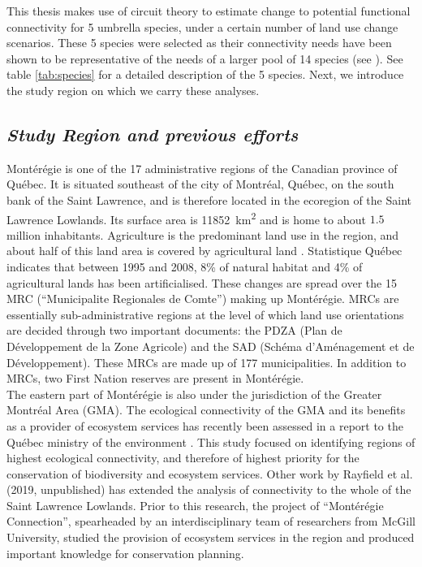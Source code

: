 \documentclass[12pt,Bold,TexShade]{thesis/mcgilletdclass}
\begin{document}
{This thesis makes use of circuit theory to estimate change to potential functional connectivity for 5 umbrella species, under a certain number of land use change scenarios. These 5 species were selected as their connectivity needs have been shown to be representative of the needs of a larger pool of 14 species (see \cite{albert_applying_2017, meurant_selecting_2018}). See table \ref{tab:species} for a detailed description of the 5 species. Next, we introduce the study region on which we carry these analyses. \\ \vspace{2em}

\subsection*{\textit{Study Region and previous efforts \\ \vspace{1em}}}

Montérégie is one of the 17 administrative regions of the Canadian province of Québec. It is situated southeast of the city of Montréal, Québec, on the south bank of the Saint Lawrence, and is therefore located in the ecoregion of the Saint Lawrence Lowlands. Its surface area is \SI{11852}{\km\squared} and is home to about $1.5$ million inhabitants. Agriculture is the predominant land use in the region, and about half of this land area is covered by agricultural land \citep{isq_quebec_2020}. Statistique Québec indicates that between 1995 and 2008, 8\% of natural habitat and 4\% of agricultural lands has been artificialised. These changes are spread over the 15 MRC (“Municipalite Regionales de Comte”) making up Montérégie. MRCs are essentially sub-administrative regions at the level of which land use orientations are decided through two important documents: the PDZA (Plan de Développement de la Zone Agricole) and the SAD (Schéma d'Aménagement et de Développement). These MRCs are made up of 177 municipalities. In addition to MRCs, two First Nation reserves are present in Montérégie. \\

The eastern part of Montérégie is also under the jurisdiction of the Greater Montréal Area (GMA). The ecological connectivity of the GMA and its benefits as a provider of ecosystem services has recently been assessed in a report to the Québec ministry of the environment \citep{rayfield_priorisation_2018}. This study focused on identifying regions of highest ecological connectivity, and therefore of highest priority for the conservation of biodiversity and ecosystem services. Other work by Rayfield et al. (2019, unpublished) has extended the analysis of connectivity to the whole of the Saint Lawrence Lowlands. Prior to this research, the project of “Montérégie Connection”, spearheaded by an interdisciplinary team of researchers from McGill University, studied the provision of ecosystem services in the region and produced important knowledge for conservation planning. \\

}
\end{document}
